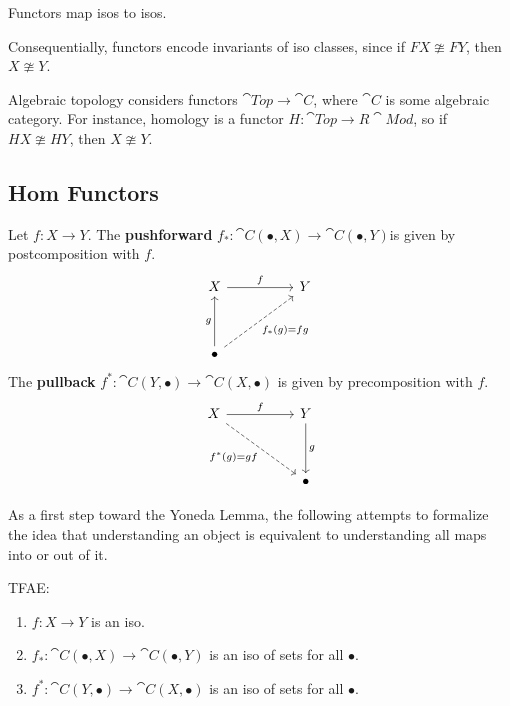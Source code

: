 \documentclass[twoside,10pt]{report}
\begin{document}

\begin{prop}
Functors map isos to isos.
\end{prop}

\noindent Consequentially, functors encode invariants of iso classes, since if $FX \ncong FY$, then $X \ncong Y$.

\begin{ex}[]
Algebraic topology considers functors $\cat{Top}\to \cat{C}$, where $\cat{C}$ is some algebraic category. For instance, homology is a functor $H : \cat{Top} \to R\cat{Mod}$, so if $HX \ncong HY$, then $X \ncong Y$.
\end{ex}

\subsection{Hom Functors}

\begin{defn}[]
Let $f: X \to Y$. The \textbf{pushforward} $f_{*}: \cat{C}(\bullet,X) \to \cat{C}(\bullet,Y)$is given by postcomposition with $f$.
\[\begin{tikzcd}
	X && Y \\
	\\
	\bullet
	\arrow["g", from=3-1, to=1-1]
	\arrow["f", from=1-1, to=1-3]
	\arrow["{f_*(g) = fg}"', dashed, from=3-1, to=1-3]
\end{tikzcd}\]
The \textbf{pullback} $f^{*}: \cat{C}(Y,\bullet) \to \cat{C}(X,\bullet)$ is given by precomposition with $f$.
\[\begin{tikzcd}
	X && Y \\
	\\
	&& \bullet
	\arrow["f", from=1-1, to=1-3]
	\arrow["g", from=1-3, to=3-3]
	\arrow["{f^*(g) = gf}"', dashed, from=1-1, to=3-3]
\end{tikzcd}\]
\end{defn}

As a first step toward the Yoneda Lemma, the following attempts to formalize the idea that understanding an object is equivalent to understanding all maps into or out of it.
\begin{prop}
TFAE:
\begin{enumerate}
	\item $f: X \to Y$ is an iso.
	\item $f_{*}: \cat{C}(\bullet,X) \to \cat{C}(\bullet,Y)$ is an iso of sets for all $\bullet$.
	\item $f^{*}: \cat{C}(Y,\bullet) \to \cat{C}(X,\bullet)$ is an iso of sets for all $\bullet$.
\end{enumerate}
\end{prop}
\end{document}
